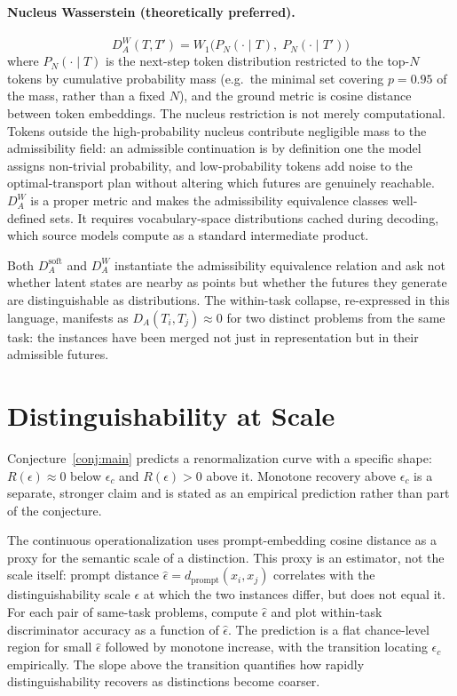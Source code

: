 \documentclass[11pt]{article}
\begin{document}
\paragraph{Nucleus Wasserstein (theoretically preferred).}
\begin{equation}
D_A^W(T, T') = W_1\bigl(P_N(\cdot \mid T),\; P_N(\cdot \mid T')\bigr)
\end{equation}
where $P_N(\cdot \mid T)$ is the next-step token distribution restricted to the top-$N$ tokens
by cumulative probability mass (e.g.\ the minimal set covering $p = 0.95$ of the mass, rather
than a fixed $N$), and the ground metric is cosine distance between token embeddings. The
nucleus restriction is not merely computational. Tokens outside the high-probability nucleus
contribute negligible mass to the admissibility field: an admissible continuation is by
definition one the model assigns non-trivial probability, and low-probability tokens add noise
to the optimal-transport plan without altering which futures are genuinely reachable. $D_A^W$
is a proper metric and makes the admissibility equivalence classes well-defined sets. It
requires vocabulary-space distributions cached during decoding, which source models compute as
a standard intermediate product.

Both $D_A^{\mathrm{soft}}$ and $D_A^W$ instantiate the admissibility equivalence relation and
ask not whether latent states are nearby as points but whether the futures they generate are
distinguishable as distributions. The within-task collapse, re-expressed in this language,
manifests as $D_A(T_i, T_j) \approx 0$ for two distinct problems from the same task: the
instances have been merged not just in representation but in their admissible futures.

\section{Distinguishability at Scale}
\label{sec:scale}

Conjecture~\ref{conj:main} predicts a renormalization curve with a specific shape: $R(\epsilon)
\approx 0$ below $\epsilon_c$ and $R(\epsilon) > 0$ above it. Monotone recovery above $\epsilon_c$
is a separate, stronger claim and is stated as an empirical prediction rather than part of the
conjecture.

The continuous operationalization uses prompt-embedding cosine distance as a proxy for the
semantic scale of a distinction. This proxy is an estimator, not the scale itself: prompt
distance $\hat\epsilon = d_{\mathrm{prompt}}(x_i, x_j)$ correlates with the distinguishability
scale $\epsilon$ at which the two instances differ, but does not equal it. For each pair of
same-task problems, compute $\hat\epsilon$ and plot within-task discriminator accuracy as a
function of $\hat\epsilon$. The prediction is a flat chance-level region for small $\hat\epsilon$
followed by monotone increase, with the transition locating $\epsilon_c$ empirically. The slope
above the transition quantifies how rapidly distinguishability recovers as distinctions become
coarser.
\end{document}
